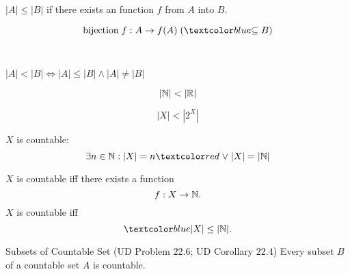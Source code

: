 \begin{frame}{}
\end{frame}

\begin{frame}{}
  \begin{definition}[$|A| \le |B|$]
    $|A| \le |B|$ if there exists an  function $f$ from $A$ into $B$.
  \end{definition}

  \pause
  \[
    \text{bijection} \;f: A \to f(A) \; (\blue{\subseteq B})
  \]

  \pause
  \vspace{0.80cm}
  \begin{center}
    {} \\[8pt] \pause
    {}
  \end{center}
\end{frame}

\begin{frame}{}
  \begin{definition}[$|A| < |B|$]
    $|A| < |B| \iff |A| \le |B| \land |A| \neq |B|$ 
  \end{definition}

  \pause
  \[
    |\mathbb{N}| < |\mathbb{R}|
  \]

  \[
    |X| < |2^{X}|
  \]
\end{frame}

\begin{frame}{}
  \begin{definition}
    $X$ is countable:
    \[
      \exists n \in \N: |X| = n \red{\;\lor\;} |X| = |\N|
    \]
  \end{definition}

  \pause
  \begin{theorem}
    $X$ is countable iff there exists a  function
    \[
      f: X \to \mathbb{N}.
    \]
    \pause
    $X$ is countable iff
    \[
      \blue{|X| \le |\N|.}
    \]
  \end{theorem}

  \pause
  \begin{exampleblock}{Subsets of Countable Set (UD Problem $22.6$; UD Corollary $22.4$)}
    Every subset $B$ of a countable set $A$ is countable.
  \end{exampleblock}
\end{frame}

